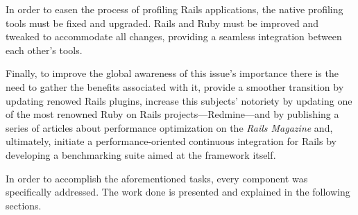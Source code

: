 In order to easen the process of profiling Rails applications, the native profiling tools must be fixed and upgraded. Rails and Ruby must be improved and tweaked to accommodate all changes, providing a seamless integration between each other's tools.

Finally, to improve the global awareness of this issue's importance there is the need to gather the benefits associated with it, provide a smoother transition by updating renowed Rails plugins, increase this subjects' notoriety by updating one of the most renowned Ruby on Rails projects---Redmine---and by publishing a series of articles about performance optimization on the \textit{Rails Magazine} and, ultimately, initiate a performance-oriented continuous integration for Rails by developing a benchmarking suite aimed at the framework itself. %

In order to accomplish the aforementioned tasks, every component was specifically addressed. The work done is presented and explained in the following sections.







